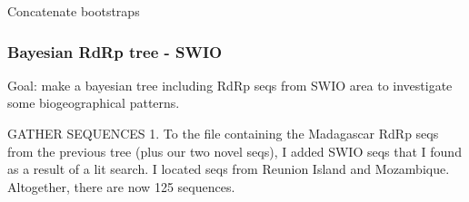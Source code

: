 \documentclass[
]{article}
\begin{document}
Concatenate bootstraps

\hypertarget{bayesian-rdrp-tree---swio}{%
\subsubsection{Bayesian RdRp tree -
SWIO}\label{bayesian-rdrp-tree---swio}}

Goal: make a bayesian tree including RdRp seqs from SWIO area to
investigate some biogeographical patterns.

GATHER SEQUENCES 1. To the file containing the Madagascar RdRp seqs from
the previous tree (plus our two novel seqs), I added SWIO seqs that I
found as a result of a lit search. I located seqs from Reunion Island
and Mozambique. Altogether, there are now 125 sequences.
\end{document}
